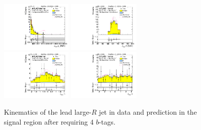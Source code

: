 \begin{figure}[htbp!]
\begin{center}
\includegraphics[width=0.31\textwidth,angle=-90]{figures/boosted/Signal/b77_FourTag_Signal_leadHCand_Pt_m.pdf}
\includegraphics[width=0.31\textwidth,angle=-90]{figures/boosted/Signal/b77_FourTag_Signal_leadHCand_Mass_s.pdf}\\
\includegraphics[width=0.31\textwidth,angle=-90]{figures/boosted/Signal/b77_FourTag_Signal_leadHCand_Eta.pdf}
\includegraphics[width=0.31\textwidth,angle=-90]{figures/boosted/Signal/b77_FourTag_Signal_leadHCand_Phi.pdf}
  \caption{Kinematics of the lead large-$R$ jet in data and prediction in the signal region after requiring 4 $b$-tags. }
  \label{fig:boosted-4b-signal-ak10-lead}
\end{center}
\end{figure}

